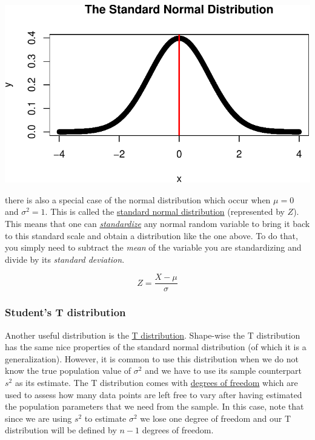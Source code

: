 \documentclass[
  letterpaper,
  DIV=11,
  numbers=noendperiod]{scrartcl}
\begin{document}
\includegraphics{stats_review_files/figure-pdf/unnamed-chunk-18-1.pdf}

there is also a special case of the normal distribution which occur when
\(\mu=0\) and \(\sigma^2=1\). This is called the
\href{https://www.scribbr.com/statistics/standard-normal-distribution/}{standard
normal distribution} (represented by \(Z\)). This means that one can
\href{https://www.listendata.com/2017/04/how-to-standardize-variable-in-regression.html}{\emph{standardize}}
any normal random variable to bring it back to this standard scale and
obtain a distribution like the one above. To do that, you simply need to
subtract the \emph{mean} of the variable you are standardizing and
divide by its \emph{standard deviation}.

\[
Z = \frac{X - \mu}{\sigma}
\]

\subsubsection{Student's T distribution}\label{students-t-distribution}

Another useful distribution is the
\href{https://en.wikipedia.org/wiki/Student\%27s_t-distribution}{T
distribution}. Shape-wise the T distribution has the same nice
properties of the standard normal distribution (of which it is a
generalization). However, it is common to use this distribution when we
do not know the true population value of \(\sigma^2\) and we have to use
its sample counterpart \(s^{2}\) as its estimate. The T distribution
comes with
\href{https://www.scribbr.com/statistics/degrees-of-freedom/\#:~:text=Degrees\%20of\%20freedom\%2C\%20often\%20represented,minus\%20the\%20number\%20of\%20restrictions.}{degrees
of freedom} which are used to assess how many data points are left free
to vary after having estimated the population parameters that we need
from the sample. In this case, note that since we are using \(s^{2}\) to
estimate \(\sigma^{2}\) we lose one degree of freedom and our T
distribution will be defined by \(n-1\) degrees of freedom.
\end{document}
